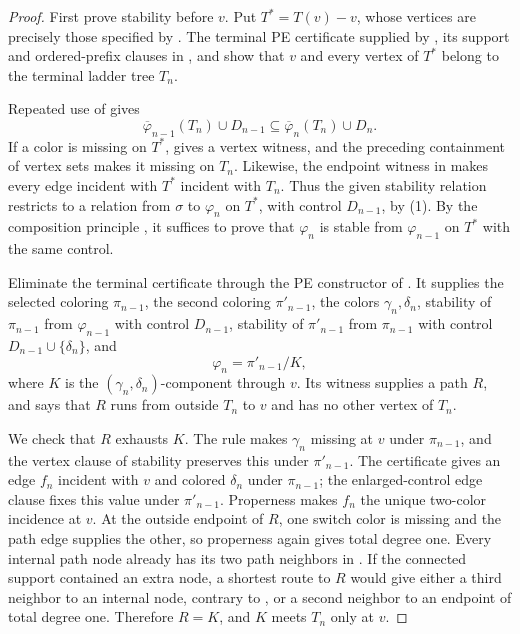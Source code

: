 \begin{proof}
First prove stability before \(v\).  Put \(T^*=T(v)-v\), whose vertices are precisely those specified by
.  The terminal PE certificate supplied by
, its support and ordered-prefix clauses in
, and
 show that \(v\) and every vertex of
\(T^*\) belong to the terminal ladder tree \(T_n\).

Repeated use of  gives
\[
 \overline\varphi_{n-1}(T_n)\cup D_{n-1}
 \subseteq \overline\varphi_n(T_n)\cup D_n.                    \tag{1}
\]
If a color is missing on \(T^*\),  gives a
vertex witness, and the preceding containment of vertex sets makes it
missing on \(T_n\).  Likewise, the endpoint witness in
 makes every edge incident with \(T^*\) incident
with \(T_n\).  Thus the given stability relation restricts to a relation
from \(\sigma\) to \(\varphi_n\) on \(T^*\), with control \(D_{n-1}\), by
(1).  By the composition principle , it suffices to prove that
\(\varphi_n\) is stable from \(\varphi_{n-1}\) on \(T^*\) with the same
control.

Eliminate the terminal certificate through the PE constructor of
.  It supplies the selected coloring
\(\pi_{n-1}\), the second coloring \(\pi'_{n-1}\), the colors
\(\gamma_n,\delta_n\), stability of \(\pi_{n-1}\) from
\(\varphi_{n-1}\) with control \(D_{n-1}\), stability of
\(\pi'_{n-1}\) from \(\pi_{n-1}\) with control
\(D_{n-1}\cup\{\delta_n\}\), and
\[
 \varphi_n=\pi'_{n-1}/K,
\]
where \(K\) is the \((\gamma_n,\delta_n)\)-component through \(v\).  Its
 witness supplies a path \(R\), and
 says that \(R\) runs from outside \(T_n\) to \(v\)
and has no other vertex of \(T_n\).

We check that \(R\) exhausts \(K\).  The rule
 makes \(\gamma_n\) missing at \(v\) under
\(\pi_{n-1}\), and the vertex clause of stability preserves this under
\(\pi'_{n-1}\).  The certificate  gives an
edge \(f_n\) incident with \(v\) and colored \(\delta_n\) under
\(\pi_{n-1}\); the enlarged-control edge clause fixes this value under
\(\pi'_{n-1}\).  Properness makes \(f_n\) the unique two-color incidence at
\(v\).  At the outside endpoint of \(R\), one switch color is missing and
the path edge supplies the other, so properness again gives total degree
one.  Every internal path node already has its two path neighbors in
.  If the connected support
 contained an extra node, a shortest route to
\(R\) would give either a third neighbor to an internal node, contrary to
, or a second neighbor to an
endpoint of total degree one.  Therefore \(R=K\), and \(K\) meets \(T_n\)
only at \(v\).


\end{proof}
